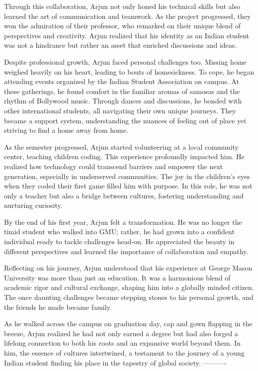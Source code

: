 \documentclass[11pt,addpoints,answers]{exam}
\begin{document}
\begin{questions}
\begin{tcolorbox}[fit,height=22cm, width=16cm, blank, borderline={1pt}{-2pt},nobeforeafter]
Through this collaboration, Arjun not only honed his technical skills but also learned the art of communication and teamwork. As the project progressed, they won the admiration of their professor, who remarked on their unique blend of perspectives and creativity. Arjun realized that his identity as an Indian student was not a hindrance but rather an asset that enriched discussions and ideas.

Despite professional growth, Arjun faced personal challenges too. Missing home weighed heavily on his heart, leading to bouts of homesickness. To cope, he began attending events organized by the Indian Student Association on campus. At these gatherings, he found comfort in the familiar aromas of samosas and the rhythm of Bollywood music. Through dances and discussions, he bonded with other international students, all navigating their own unique journeys. They became a support system, understanding the nuances of feeling out of place yet striving to find a home away from home.

As the semester progressed, Arjun started volunteering at a local community center, teaching children coding. This experience profoundly impacted him. He realized how technology could transcend barriers and empower the next generation, especially in underserved communities. The joy in the children's eyes when they coded their first game filled him with purpose. In this role, he was not only a teacher but also a bridge between cultures, fostering understanding and nurturing curiosity.

By the end of his first year, Arjun felt a transformation. He was no longer the timid student who walked into GMU; rather, he had grown into a confident individual ready to tackle challenges head-on. He appreciated the beauty in different perspectives and learned the importance of collaboration and empathy.

Reflecting on his journey, Arjun understood that his experience at George Mason University was more than just an education. It was a harmonious blend of academic rigor and cultural exchange, shaping him into a globally minded citizen. The once daunting challenges became stepping stones to his personal growth, and the friends he made became family.

As he walked across the campus on graduation day, cap and gown flapping in the breeze, Arjun realized he had not only earned a degree but had also forged a lifelong connection to both his roots and an expansive world beyond them. In him, the essence of cultures intertwined, a testament to the journey of a young Indian student finding his place in the tapestry of global society.
----------
    \end{tcolorbox}


\end{questions}
\end{document}
